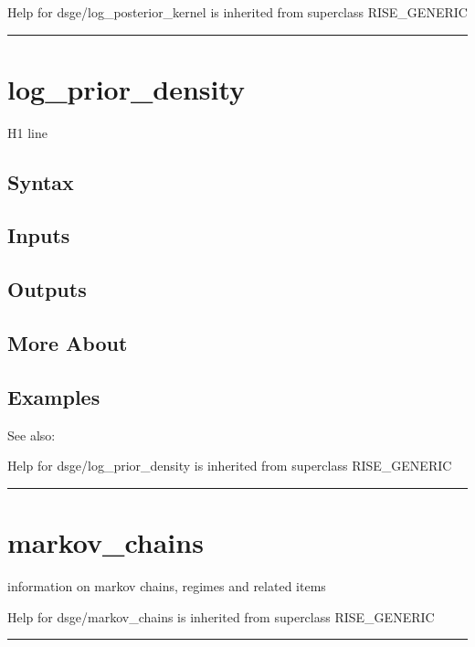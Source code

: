 \documentclass[letterpaper,10pt,english]{sphinxmanual}
\begin{document}
Help for dsge/log\_posterior\_kernel is inherited from superclass RISE\_GENERIC


\bigskip\hrule{}\bigskip



\section{log\_prior\_density}
\label{classes/models/@dsge/dsge:id114}\label{classes/models/@dsge/dsge:log-prior-density}
H1 line


\subsection{Syntax}
\label{classes/models/@dsge/dsge:id115}

\subsection{Inputs}
\label{classes/models/@dsge/dsge:id116}

\subsection{Outputs}
\label{classes/models/@dsge/dsge:id117}

\subsection{More About}
\label{classes/models/@dsge/dsge:id118}

\subsection{Examples}
\label{classes/models/@dsge/dsge:id119}
See also:

Help for dsge/log\_prior\_density is inherited from superclass RISE\_GENERIC


\bigskip\hrule{}\bigskip



\section{markov\_chains}
\label{classes/models/@dsge/dsge:markov-chains}\label{classes/models/@dsge/dsge:id120}
information on markov chains, regimes and related items

Help for dsge/markov\_chains is inherited from superclass RISE\_GENERIC


\bigskip\hrule{}\bigskip
\end{document}
